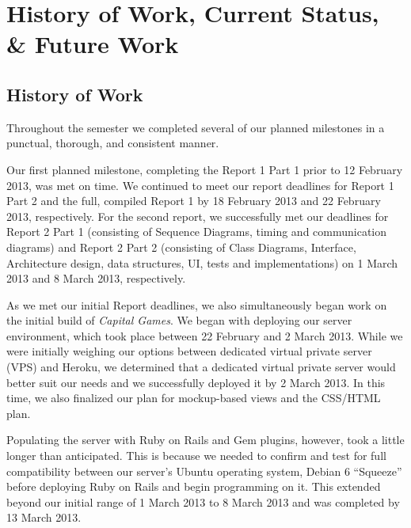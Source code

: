 \chapter{History of Work, Current Status, \& Future Work}


\section{History of Work}

Throughout the semester we completed several of our planned milestones in a punctual,
 thorough, and consistent manner.

Our first planned milestone, completing the Report 1 Part 1 prior to 12 February 2013, 
was met on time. We continued to meet our report deadlines 
for Report 1 Part 2 and the full, compiled Report 1 by 
18 February 2013 and 22 February 2013, respectively. 
For the second report, we successfully met our deadlines for Report 2 Part 1 
(consisting of Sequence Diagrams, timing and communication diagrams) 
and Report 2 Part 2 (consisting of Class Diagrams, Interface, Architecture 
design, data structures, UI, tests and implementations) 
on 1 March 2013 and 8 March 2013, respectively.

As we met our initial Report deadlines, we also simultaneously 
began work on the initial build of \textit{Capital Games}. We began with 
deploying our server environment, which took place between 22 February 
and 2 March 2013. While we were initially weighing our options between 
dedicated virtual private server (VPS) and Heroku, we determined that 
a dedicated virtual private server would better suit our needs and we 
successfully deployed it by 2 March 2013. In this time, we also finalized 
our plan for mockup-based views and the CSS/HTML plan. 

Populating the server with Ruby on Rails and Gem plugins, however, 
took a little longer than anticipated. This is because we needed to 
confirm and test for full compatibility between our server's Ubuntu 
operating system, Debian 6 ``Squeeze'' before deploying Ruby on 
Rails and begin programming on it. This extended beyond our initial 
range of 1 March 2013 to 8 March 2013 and was completed by 13 March 2013.


